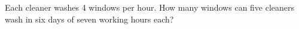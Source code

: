Each cleaner washes 4 windows per hour. How many windows can five cleaners wash in six days of seven working hours each?
